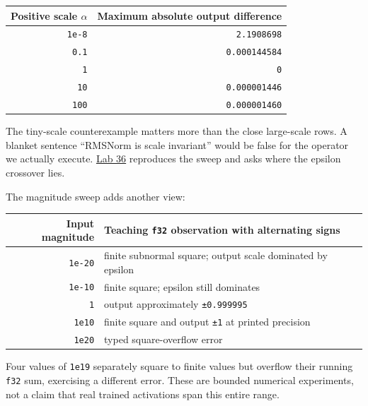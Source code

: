 \documentclass[
  10pt,
]{article}
\newcounter{none} %
\begin{document}

{\def\LTcaptype{none} %
\begin{longtable}[]{@{}rr@{}}
\toprule\noalign{}
Positive scale \(\alpha\) & Maximum absolute output difference \\
\midrule\noalign{}
\endhead
\bottomrule\noalign{}
\endlastfoot
\texttt{1e-8} & \texttt{2.1908698} \\
\texttt{0.1} & \texttt{0.000144584} \\
\texttt{1} & \texttt{0} \\
\texttt{10} & \texttt{0.000001446} \\
\texttt{100} & \texttt{0.000001460} \\
\end{longtable}
}

The tiny-scale counterexample matters more than the close large-scale
rows. A blanket sentence ``RMSNorm is scale invariant'' would be false
for the operator we actually execute.
\href{https://github.com/hermonai/inside-the-llm-engine/blob/astra-visual-rewrite/labs/lab-36-rmsnorm-scale-experiment.md}{Lab
36} reproduces the sweep and asks where the epsilon crossover lies.

The magnitude sweep adds another view:


{\def\LTcaptype{none} %
\begin{longtable}[]{@{}rl@{}}
\toprule\noalign{}
Input magnitude & Teaching \texttt{f32} observation with alternating
signs \\
\midrule\noalign{}
\endhead
\bottomrule\noalign{}
\endlastfoot
\texttt{1e-20} & finite subnormal square; output scale dominated by
epsilon \\
\texttt{1e-10} & finite square; epsilon still dominates \\
\texttt{1} & output approximately \texttt{±0.999995} \\
\texttt{1e10} & finite square and output \texttt{±1} at printed
precision \\
\texttt{1e20} & typed square-overflow error \\
\end{longtable}
}

Four values of \texttt{1e19} separately square to finite values but
overflow their running \texttt{f32} sum, exercising a different error.
These are bounded numerical experiments, not a claim that real trained
activations span this entire range.
\end{document}
